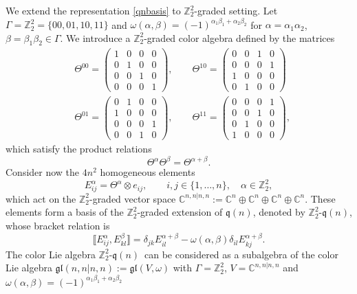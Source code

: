 \documentclass[pdftex]{sigma}
\numberwithin{equation}{section}
\theoremstyle{definition}
\def\Z2{\mathbb{Z}_2^2}
\def\gl{\mathfrak{gl}}
\def\qq{$\Z2$-$\q(n)$}
\def\q{\mathfrak{q}}
\begin{document}
We extend the representation \eqref{qnbasis} to $\Z2$-graded setting.
Let $\Gamma=\Z2=\{00,01,10,11\}$ and
$\omega(\alpha,\beta)=(-1)^{\alpha_1\beta_1+\alpha_2\beta_2}$ for $\alpha = \alpha_1\alpha_2$, $\beta =\beta_1\beta_2 \in\Gamma$.
We introduce a $\Z2$-graded color algebra defined by the matrices
\begin{align}
	&
	\Theta^{00}= \left(\begin{matrix}
		1 & 0 & 0 & 0
		\\
		0 & 1 & 0 & 0
		\\
		0 & 0 & 1 & 0
		\\
		0 & 0 & 0 & 1
	\end{matrix}\right), \qquad
	\Theta^{10}=\left(\begin{matrix}
		0 & 0 & 1 & 0
		\\
		0 & 0 & 0 & 1
		\\
		1 & 0 & 0 & 0
		\\
		0 & 1 & 0 & 0
	\end{matrix}\right) \nonumber\\
	&
	\Theta^{01}=\left(\begin{matrix}
		0 & 1 & 0 & 0
		\\
		1 & 0 & 0 & 0
		\\
		0 & 0 & 0 & 1
		\\
		0 & 0 & 1 & 0
	\end{matrix}\right),\qquad
	\Theta^{11}=\left(\begin{matrix}
		0 & 0 & 0 & 1
		\\
		0 & 0 & 1 & 0
		\\
		0 & 1 & 0 & 0
		\\
		1 & 0 & 0 & 0
	\end{matrix}\right),
	\label{Theta}
\end{align}
which satisfy the product relations
\begin{equation}
	\Theta^\alpha\Theta^\beta=\Theta^{\alpha+\beta}.
	\label{OO}
\end{equation}
Consider now the $4n^2$ homogeneous elements
\[
E_{ij}^\alpha = \Theta^\alpha \otimes e_{ij}, \qquad i,j\in\{1,\ldots,n\},\quad \alpha\in\Z2,
\]
which act on the $\Z2$-graded vector space
$ \mathbb{C}^{n,n|n,n} := \mathbb{C}^n \oplus \mathbb{C}^n \oplus \mathbb{C}^n \oplus \mathbb{C}^n.$ These elements form a basis of the $\Z2$-graded extension of $\q(n)$, denoted by \qq, whose
bracket relation is
\begin{equation*}
	\bigl\llbracket E_{ij}^\alpha, E_{kl}^\beta \bigr\rrbracket =
	\delta_{jk} E_{il}^{\alpha+\beta} - \omega(\alpha,\beta) \delta_{il}E_{kj}^{\alpha+\beta}.
\end{equation*}
The color Lie algebra \qq \ can be considered as a subalgebra of the color Lie algebra $\gl(n,n|n,n) :=\gl(V,\omega)$
with $\Gamma=\Z2$, $V = \mathbb{C}^{n,n|n,n}$ and $\omega(\alpha,\beta)=(-1)^{\alpha_1\beta_1+\alpha_2\beta_2}$
\end{document}
